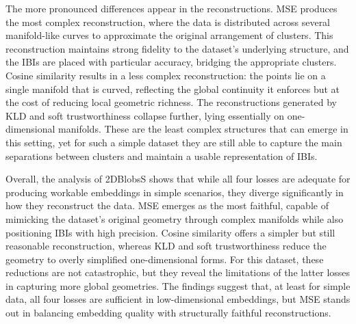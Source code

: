 The more pronounced differences appear in the reconstructions. MSE produces the most complex reconstruction, where the data is distributed across several manifold-like curves to approximate the original arrangement of clusters. This reconstruction maintains strong fidelity to the dataset’s underlying structure, and the IBIs are placed with particular accuracy, bridging the appropriate clusters. Cosine similarity results in a less complex reconstruction: the points lie on a single manifold that is curved, reflecting the global continuity it enforces but at the cost of reducing local geometric richness. The reconstructions generated by KLD and soft trustworthiness collapse further, lying essentially on one-dimensional manifolds. These are the least complex structures that can emerge in this setting, yet for such a simple dataset they are still able to capture the main separations between clusters and maintain a usable representation of IBIs.

Overall, the analysis of 2DBlobsS shows that while all four losses are adequate for producing workable embeddings in simple scenarios, they diverge significantly in how they reconstruct the data. MSE emerges as the most faithful, capable of mimicking the dataset’s original geometry through complex manifolds while also positioning IBIs with high precision. Cosine similarity offers a simpler but still reasonable reconstruction, whereas KLD and soft trustworthiness reduce the geometry to overly simplified one-dimensional forms. For this dataset, these reductions are not catastrophic, but they reveal the limitations of the latter losses in capturing more global geometries. The findings suggest that, at least for simple data, all four losses are sufficient in low-dimensional embeddings, but MSE stands out in balancing embedding quality with structurally faithful reconstructions.

